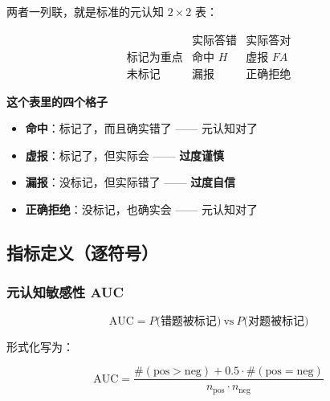 \documentclass[UTF8,a4paper,11pt]{ctexart}
\newenvironment{explainbox}[1]
{\begin{center}\begin{minipage}{0.94\textwidth}\colorbox{boxbg}{\parbox{0.92\textwidth}{\textbf{#1}\par\vspace{2pt}}}}
{\end{minipage}\end{center}}
\begin{document}
两者一列联，就是标准的元认知 $2\times2$ 表：

\begin{equation}
\begin{array}{c|cc}
 & \text{实际答错} & \text{实际答对} \\ \hline
\text{标记为重点} & \text{命中 } H & \text{虚报 } FA \\
\text{未标记} & \text{漏报} & \text{正确拒绝}
\end{array}
\end{equation}

\begin{explainbox}{这个表里的四个格子}
\begin{itemize}[leftmargin=1.4em,itemsep=1pt]
\item \textbf{命中}：标记了，而且确实错了 —— 元认知对了
\item \textbf{虚报}：标记了，但实际会 —— \textbf{过度谨慎}
\item \textbf{漏报}：没标记，但实际错了 —— \textbf{过度自信}
\item \textbf{正确拒绝}：没标记，也确实会 —— 元认知对了
\end{itemize}
\end{explainbox}

\subsection{指标定义（逐符号）}

\subsubsection{元认知敏感性 AUC}

\begin{equation}
\text{AUC} = P\Big(\text{错题被标记}\Big) \ \text{vs} \ P\Big(\text{对题被标记}\Big)
\end{equation}

形式化写为：

\begin{equation}
\text{AUC} = \frac{\#(\text{pos} > \text{neg}) + 0.5 \cdot \#(\text{pos} = \text{neg})}{n_{\text{pos}} \cdot n_{\text{neg}}}
\end{equation}
\end{document}
